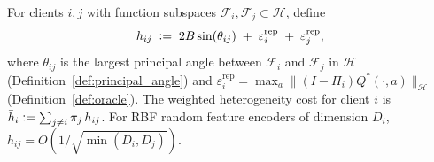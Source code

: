 







\begin{definition}
\label{def:het_cost}
For clients $i,j$ with function subspaces
$\mathcal{F}_i,\mathcal{F}_j\subset\mathcal{H}$, define
\begin{equation}
    h_{ij}
    \;\vcentcolon=\;
    2B\sin(\theta_{ij})
    \;+\;
    \varepsilon_i^{\mathrm{rep}}
    \;+\;
    \varepsilon_j^{\mathrm{rep}},
    \label{eq:hij_def}
\end{equation}
where $\theta_{ij}$ is the largest principal angle
between $\mathcal{F}_i$ and $\mathcal{F}_j$ in
$\mathcal{H}$ (Definition~\ref{def:principal_angle})
and $\varepsilon_i^{\mathrm{rep}}
= \max_a\|(I-\Pi_i)Q^*(\cdot,a)\|_{\mathcal{H}}$
(Definition~\ref{def:oracle}).
The weighted heterogeneity cost for client $i$ is
$\bar{h}_i \vcentcolon= \sum_{j\neq i}\pi_j\,h_{ij}$.
For RBF random feature encoders of dimension $D_i$,
$h_{ij} = O(1/\sqrt{\min(D_i,D_j)})$.
\end{definition}

